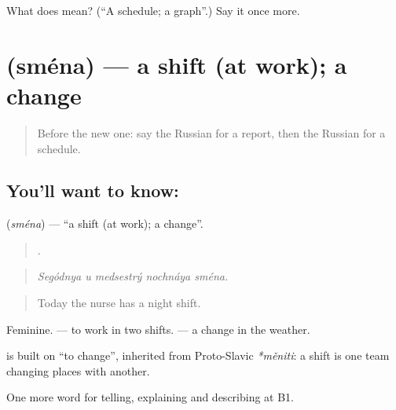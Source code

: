 \begin{tcolorbox}[breakable,colback=teal!4,colframe=teal!35!black,title={Before you move on}]
What does  mean? (\textquotedblleft{}A schedule; a graph\textquotedblright{}.) Say it once more.
\end{tcolorbox}
\section[\texorpdfstring{\ru{смена} (sména)}{смена (sména)}]{ (sména) — a shift (at work); a change}

\label{lesson:RU-C360-smena}



\begin{quote}
Before the new one: say the Russian for a report, then the Russian for a schedule.
\end{quote}

\subsection*{You'll want to know: }
\textbf{} (\emph{sména}) — \textquotedblleft{}a shift (at work); a change\textquotedblright{}.

\begin{quote}
    .
\end{quote}

\begin{quote}
\emph{Segódnya u medsestrý nochnáya sména.}
\end{quote}

\begin{quote}
Today the nurse has a night shift.
\end{quote}

Feminine. \emph{   } — to work in two shifts. \emph{ } — a change in the weather.

\begin{cousinweb}
\textbf{} is built on \emph{} \textquotedblleft{}to change\textquotedblright{}, inherited from Proto-Slavic \emph{*měniti}: a shift is one team changing places with another.
\end{cousinweb}

\begin{grammarlens}[title={What you've built}]
One more word for telling, explaining and describing at B1.
\end{grammarlens}

